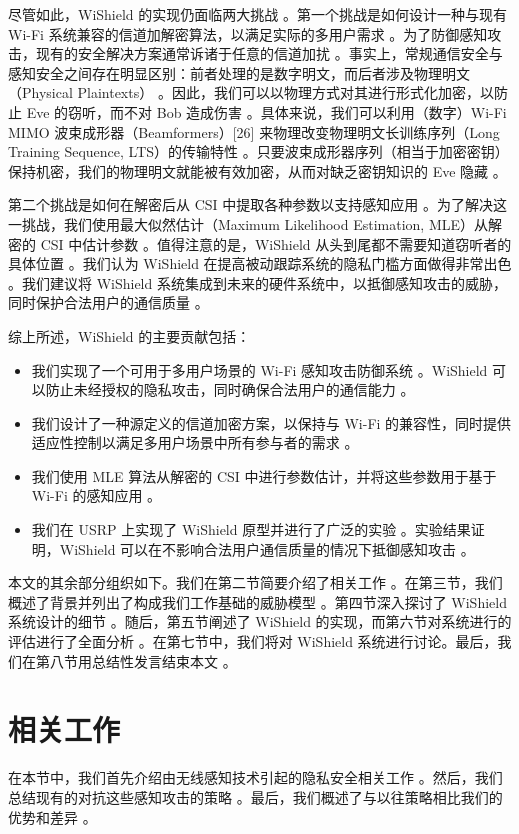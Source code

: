\documentclass[journal]{IEEEtran}
\begin{document}
尽管如此，WiShield 的实现仍面临两大挑战 。第一个挑战是如何设计一种与现有 Wi-Fi 系统兼容的信道加解密算法，以满足实际的多用户需求 。为了防御感知攻击，现有的安全解决方案通常诉诸于任意的信道加扰 。事实上，常规通信安全与感知安全之间存在明显区别：前者处理的是数字明文，而后者涉及物理明文（Physical Plaintexts） 。因此，我们可以以物理方式对其进行形式化加密，以防止 Eve 的窃听，而不对 Bob 造成伤害 。具体来说，我们可以利用（数字）Wi-Fi MIMO 波束成形器（Beamformers）[26] 来物理改变物理明文长训练序列（Long Training Sequence, LTS）的传输特性 。只要波束成形器序列（相当于加密密钥）保持机密，我们的物理明文就能被有效加密，从而对缺乏密钥知识的 Eve 隐藏 。

第二个挑战是如何在解密后从 CSI 中提取各种参数以支持感知应用 。为了解决这一挑战，我们使用最大似然估计（Maximum Likelihood Estimation, MLE）从解密的 CSI 中估计参数 。值得注意的是，WiShield 从头到尾都不需要知道窃听者的具体位置 。我们认为 WiShield 在提高被动跟踪系统的隐私门槛方面做得非常出色 。我们建议将 WiShield 系统集成到未来的硬件系统中，以抵御感知攻击的威胁，同时保护合法用户的通信质量 。

综上所述，WiShield 的主要贡献包括：
\begin{itemize}
\item 我们实现了一个可用于多用户场景的 Wi-Fi 感知攻击防御系统 。WiShield 可以防止未经授权的隐私攻击，同时确保合法用户的通信能力 。
\item 我们设计了一种源定义的信道加密方案，以保持与 Wi-Fi 的兼容性，同时提供适应性控制以满足多用户场景中所有参与者的需求 。
\item 我们使用 MLE 算法从解密的 CSI 中进行参数估计，并将这些参数用于基于 Wi-Fi 的感知应用 。
\item 我们在 USRP 上实现了 WiShield 原型并进行了广泛的实验 。实验结果证明，WiShield 可以在不影响合法用户通信质量的情况下抵御感知攻击 。
\end{itemize}

本文的其余部分组织如下。我们在第二节简要介绍了相关工作 。在第三节，我们概述了背景并列出了构成我们工作基础的威胁模型 。第四节深入探讨了 WiShield 系统设计的细节 。随后，第五节阐述了 WiShield 的实现，而第六节对系统进行的评估进行了全面分析 。在第七节中，我们将对 WiShield 系统进行讨论。最后，我们在第八节用总结性发言结束本文 。

\section{相关工作}
在本节中，我们首先介绍由无线感知技术引起的隐私安全相关工作 。然后，我们总结现有的对抗这些感知攻击的策略 。最后，我们概述了与以往策略相比我们的优势和差异 。
\end{document}
